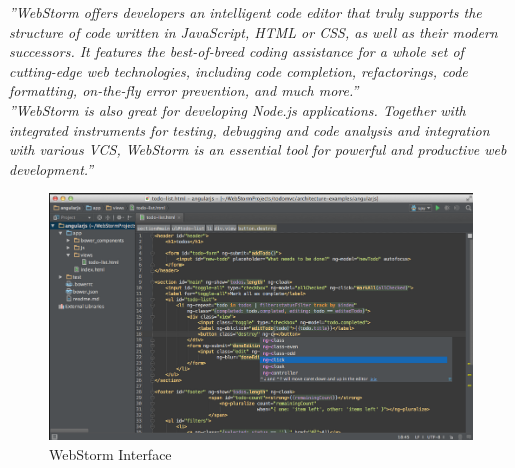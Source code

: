 \textit{''WebStorm offers developers an intelligent code editor that truly supports the structure of code written in JavaScript, HTML or CSS, as well as their modern  successors. It features the best-of-breed coding assistance for a whole set of  cutting-edge web technologies, including code completion, refactorings, code formatting, on-the-fly error prevention, and much more.''}\cite{webstorm}
\\

\textit{''WebStorm is also great for developing Node.js applications. Together with integrated instruments 
for testing, debugging and code analysis and integration with various VCS, WebStorm is an essential tool for powerful and productive web development.''}\cite{webstorm}
\\

\begin{figure}[h]
\centering
\includegraphics[width=1\linewidth]{graphics/chapter3/1}
\caption{WebStorm Interface}
\end{figure}


